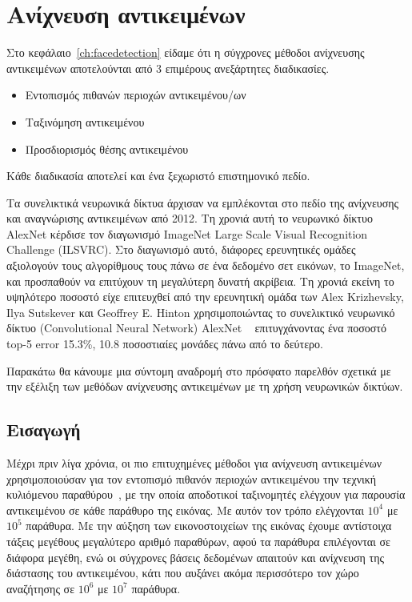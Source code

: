 \chapter{Ανίχνευση αντικειμένων}\label{ch:objectdetection}


Στο κεφάλαιο~\ref{ch:facedetection} είδαμε ότι η σύγχρονες μέθοδοι ανίχνευσης αντικειμένων
αποτελούνται από 3 επιμέρους ανεξάρτητες διαδικασίες.
\begin{itemize}
    \item Εντοπισμός πιθανών περιοχών αντικειμένου/ων
    \item Ταξινόμηση αντικειμένου
    \item Προσδιορισμός θέσης αντικειμένου
\end{itemize}

Κάθε διαδικασία αποτελεί και ένα ξεχωριστό επιστημονικό πεδίο.

Τα συνελικτικά νευρωνικά δίκτυα άρχισαν να εμπλέκονται στο πεδίο της ανίχνευσης
και αναγνώρισης αντικειμένων από 2012. Τη χρονιά αυτή το νευρωνικό δίκτυο AlexNet
κέρδισε τον διαγωνισμό ImageNet Large Scale Visual Recognition Challenge (ILSVRC).
Στο διαγωνισμό αυτό, διάφορες ερευνητικές ομάδες αξιολογούν τους αλγορίθμους τους
πάνω σε ένα δεδομένο σετ εικόνων, το ImageNet,
και προσπαθούν να επιτύχουν τη μεγαλύτερη δυνατή ακρίβεια. Τη χρονιά εκείνη το
υψηλότερο ποσοστό είχε επιτευχθεί από την ερευνητική ομάδα των Alex Krizhevsky,
Ilya Sutskever και Geoffrey E. Hinton χρησιμοποιώντας το συνελικτικό νευρωνικό
δίκτυο (Convolutional Neural Network) AlexNet ~\cite{NIPS2012_4824} επιτυγχάνοντας
ένα ποσοστό top-5 error 15.3\%, 10.8 ποσοστιαίες μονάδες πάνω από το δεύτερο.

Παρακάτω θα κάνουμε μια σύντομη αναδρομή στο πρόσφατο παρελθόν σχετικά με την
εξέλιξη των μεθόδων ανίχνευσης αντικειμένων με τη χρήση νευρωνικών δικτύων.

\section{Εισαγωγή}\label{sec:objintro}

Μέχρι πριν λίγα χρόνια, οι πιο επιτυχημένες μέθοδοι για ανίχνευση αντικειμένων
χρησιμοποιούσαν για τον εντοπισμό πιθανόν περιοχών αντικειμένου την τεχνική
κυλιόμενου παραθύρου~\cite{Viola2004, Papageorgiou:2000:TSO:355338.355341, 5255236}, με την οποία
αποδοτικοί ταξινομητές ελέγχουν για παρουσία αντικειμένου σε κάθε παράθυρο της
εικόνας. Με αυτόν τον τρόπο ελέγχονται $10^4$ με $10^5$ παράθυρα. Με την αύξηση των
εικονοστοιχείων της εικόνας έχουμε αντίστοιχα τάξεις μεγέθους μεγαλύτερο αριθμό παραθύρων,
αφού τα παράθυρα επιλέγονται σε διάφορα μεγέθη, ενώ οι σύγχρονες βάσεις δεδομένων
απαιτούν και ανίχνευση της διάστασης του αντικειμένου, κάτι που αυξάνει ακόμα
περισσότερο τον χώρο αναζήτησης σε $10^6$ με $10^7$ παράθυρα.

